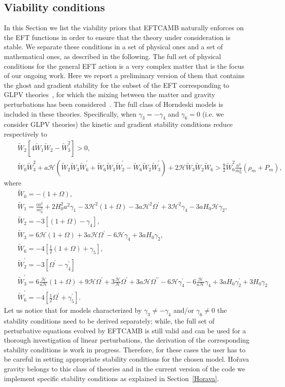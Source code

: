 \documentclass[prd,nofootinbib,showpacs]{revtex4}
\def\ba{\begin{eqnarray}}
\def\ea{\end{eqnarray}}
\def\l{\left}
\def\r{\right}
\def\f{\frac}
\def\hub{{\mathcal H}}
\begin{document}
{\subsection{Viability conditions}\label{SubSec:ViabilityConditions}
%
In this Section we list the viability priors that EFTCAMB naturally enforces on the EFT functions in order to ensure that the theory under consideration is stable. We separate these conditions in a set of physical ones and a set of mathematical ones, as  described in the following. The full set of physical conditions for the general EFT action is a very complex matter that is the focus of our ongoing work. Here we report a preliminary version of them that contains the ghost and gradient stability for the subset of the EFT corresponding to GLPV theories~\cite{Gleyzes:2014dya}, for which the mixing between the matter and gravity perturbations has been considered~\cite{Kase:2014cwa}. The full class of Horndeski models is included in these theories. 
Specifically, when $\gamma_3=-\gamma_4$ and $\gamma_6=0$ (i.e. we consider GLPV  theories) the kinetic and gradient stability conditions reduce respectively to
\ba
&&\tilde{W}_2\l[4\tilde{W}_1\tilde{W}_2-\tilde{W}_3^2\r]>0,\\
&&\tilde{W}_0\tilde{W}_3^2+a\hub\l(\tilde{W}_2\tilde{W}_3\tilde{W}_6^\prime+\tilde{W}_6\tilde{W}_3\tilde{W}_2^\prime-\tilde{W}_6\tilde{W}_2\tilde{W}_3^\prime\r)+2\hub\tilde{W}_3\tilde{W}_2\tilde{W}_6>\f{9}{2}\tilde{W}_6^2\f{a^2}{m_0^2}(\rho_m+P_m),
\ea
where
\ba
&&\tilde{W}_0=-(1+\Omega), \\
&&\tilde{W}_1=\f{ca^2}{m_0^2}+2H_0^2a^2\gamma_1-3\hub^2(1+\Omega)-3a\hub^2\Omega^\prime+3\hub^2\gamma_4-3aH_0\hub\gamma_2, \\
&&\tilde{W}_2=-3[(1+\Omega)-\gamma_4], \\
&&\tilde{W}_3=6\hub(1+\Omega)+3a\hub\Omega^\prime-6\hub\gamma_4+3aH_0\gamma_2,\\
&&\tilde{W}_6=-4\l[\f{1}{2}(1+\Omega)+\gamma_5\r],\\
&&\tilde{W}_2^\prime=-3[\Omega^\prime-\gamma_4^\prime]\\
&&\tilde{W}_3^\prime= 6\f{\dot{\hub}}{a\hub}(1+\Omega)+9\hub\Omega^\prime+3\f{\dot{\hub}}{\hub}\Omega^\prime+3a\hub\Omega^{\prime\prime}-6\hub\gamma_4^\prime-6\f{\dot{\hub}}{a\hub}\gamma_4+3aH_0\gamma_2^\prime+3H_0\gamma_2 \\
&&\tilde{W}_6^\prime=-4\l[\f{1}{2}\Omega^\prime+\gamma_5^\prime\r].
\ea
Let us notice that for models characterized by $\gamma_3\neq-\gamma_4$ and/or $\gamma_6\neq0$ the stability conditions need to be derived separately; while, the full set of perturbative equations evolved by EFTCAMB is still valid and can be used for a thorough investigation of linear perturbations, the derivation of the corresponding stability conditions  is work in progress. Therefore, for these cases the user has to be careful in setting appropriate stability conditions for the chosen model. Ho\v rava gravity belongs to this class of theories and in the current version of the code we implement specific stability conditions as explained in Section~\ref{Horava}.


}
\end{document}
